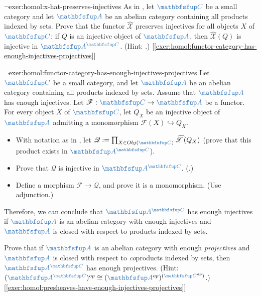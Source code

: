 \begin{exer}{$\lnot$}{exer:homol:x-hat-preserves-injectives}
  As in ,
  let $\categ{C}$ be a small category and let $\categ{A}$ be an
  abelian category containing all products indexed by sets. Prove that
  the functor $\widehat{\mathscr{X}}$ preserves injectives for all
  objects $X$ of $\categ{C}$: if $Q$ is an injective object of
  $\categ{A}$, then $\widehat{\mathscr{X}}(Q)$ is injective in
  $\categ{A}^{\categ{C}}$. (Hint:
  .)
  [\ref{exer:homol:functor-category-has-enough-injectives-projectives}]
\end{exer}
\begin{exer}{$\lnot$}{exer:homol:functor-category-has-enough-injectives-projectives}
  Let $\categ{C}$ be a small category, and let $\categ{A}$ be an
  abelian category containing all products indexed by sets. Assume
  that $\categ{A}$ has enough injectives. Let
  $\mathscr{F} : \categ{C} \to \categ{A}$ be a functor. For every
  object $X$ of $\categ{C}$, let $Q_X$ be an injective object of
  $\categ{A}$ admitting a monomorphism
  $\mathscr{F}(X) \hookrightarrow Q_X$.
  \begin{itemize}
  \item With notation as in
    , let
    $\mathscr{Q} := \prod_{X \in \Obj(\categ{C})}
    \widehat{\mathscr{X}}(Q_X)$ (prove that this product exists in
    $\categ{A}^{\categ{C}}$).
  \item Prove that $\mathscr{Q}$ is injective in
    $\categ{A}^{\categ{C}}$.
    (.)
  \item Define a morphism $\mathscr{F} \to \mathscr{Q}$, and prove it
    is a monomorphism. (Use adjunction.)
  \end{itemize}
  Therefore, we can conclude that $\categ{A}^{\categ{C}}$ has enough
  injectives if $\categ{A}$ is an abelian category with enough
  injectives and $\categ{A}$ is closed with respect to products
  indexed by sets.

  Prove that if $\categ{A}$ is an abelian category with enough
  \emph{projectives} and $\categ{A}$ is closed with respect to
  \emph{co}products indexed by sets, then $\categ{A}^{\categ{C}}$ has
  enough projectives. (Hint:
  $(\categ{A}^{\categ{C}})^{op} \cong
  (\categ{A}^{op})^{(\categ{C}^{op})}$.)
  [\ref{exer:homol:presheaves-have-enough-injectives-projectives}]
\end{exer}
